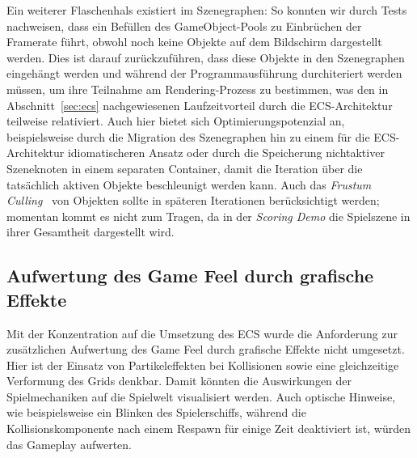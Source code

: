 Ein weiterer Flaschenhals existiert im Szenegraphen: So konnten wir durch Tests nachweisen, dass ein Befüllen des GameObject-Pools zu Einbrüchen der Framerate führt, obwohl noch keine Objekte auf dem Bildschirm dargestellt werden.
Dies ist darauf zurückzuführen, dass diese Objekte in den Szenegraphen eingehängt werden und während der Programmausführung durchiteriert werden müssen, um ihre Teilnahme am Rendering-Prozess zu bestimmen, was den in Abschnitt~\ref{sec:ecs} nachgewiesenen Laufzeitvorteil durch die ECS-Architektur teilweise relativiert.
Auch hier bietet sich Optimierungspotenzial an, beispielsweise durch die Migration des Szenegraphen hin zu einem für die ECS-Architektur idiomatischeren Ansatz oder durch die Speicherung nichtaktiver Szeneknoten in einem separaten Container, damit die Iteration über die tatsächlich aktiven Objekte beschleunigt werden kann.
Auch das \textit{Frustum Culling}~\cite[830]{AHHP+18} von Objekten sollte in späteren Iterationen berücksichtigt werden; momentan kommt es nicht zum Tragen, da in der \textit{Scoring Demo} die Spielszene in ihrer Gesamtheit dargestellt wird.\\

\subsection*{Aufwertung des Game Feel durch grafische Effekte}
Mit der Konzentration auf die Umsetzung des ECS wurde die Anforderung zur zusätzlichen Aufwertung des Game Feel durch grafische Effekte nicht umgesetzt.
Hier ist der Einsatz von Partikeleffekten bei Kollisionen sowie eine gleichzeitige Verformung des Grids denkbar.
Damit könnten die Auswirkungen der Spielmechaniken auf die Spielwelt visualisiert werden.
Auch optische Hinweise, wie beispielsweise ein Blinken des Spielerschiffs, während die Kollisionskomponente nach einem Respawn für einige Zeit deaktiviert ist, würden das Gameplay aufwerten.